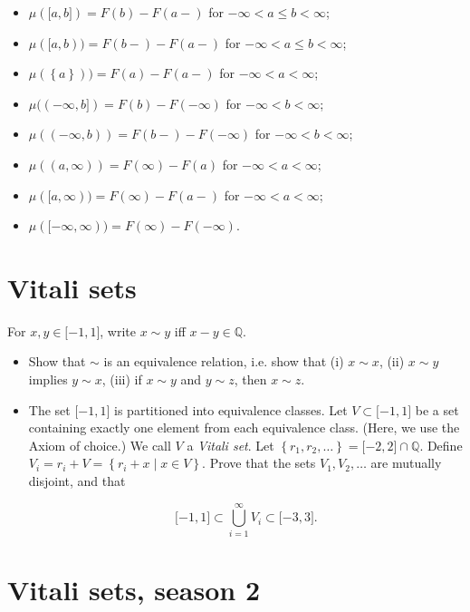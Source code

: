 \begin{itemize}
\item
  \(\mu(\lbrack a,b\rbrack) = F(b) - F(a - )\) for \(- \infty < a \leq b < \infty\);
\item
  \(\mu(\lbrack a,b)) = F(b - ) - F(a - )\) for \(- \infty < a \leq b < \infty\);
\item
  \(\mu(\left\{ a \right\})) = F(a) - F(a - )\) for \(- \infty < a < \infty\);
\item
  \(\mu(( - \infty,b\rbrack) = F(b) - F( - \infty)\) for \(- \infty < b < \infty\);
\item
  \(\mu(( - \infty,b)) = F(b - ) - F( - \infty)\) for \(- \infty < b < \infty\);
\item
  \(\mu((a,\infty)) = F(\infty) - F(a)\) for \(- \infty < a < \infty\);
\item
  \(\mu(\lbrack a,\infty)) = F(\infty) - F(a - )\) for \(- \infty < a < \infty\);
\item
  \(\mu(\lbrack - \infty,\infty)) = F(\infty) - F( - \infty)\).
\end{itemize}

\section{Vitali sets}\label{vitali-sets}

For \(x,y \in \lbrack - 1,1\rbrack\), write \(x \sim y\) iff \(x - y \in \mathbb{Q}\).

\begin{itemize}
\item
  Show that \(\sim\) is an equivalence relation, i.e. show that (i) \(x \sim x\), (ii) \(x \sim y\) implies \(y \sim x\), (iii) if \(x \sim y\) and \(y \sim z\), then \(x \sim z\).
\item
  The set \(\lbrack - 1,1\rbrack\) is partitioned into equivalence classes. Let \(V \subset \lbrack - 1,1\rbrack\) be a set containing exactly one element from each equivalence class. (Here, we use the Axiom of choice.) We call \(V\) a \emph{Vitali set}. Let \(\left\{ {r_{1},r_{2},\ldots} \right\} = \lbrack - 2,2\rbrack \cap \mathbb{Q}\). Define \(V_{i} = r_{i} + V = \left\{ {r_{i} + x \mid x \in V} \right\}\). Prove that the sets \(V_{1},V_{2},\ldots\) are mutually disjoint, and that

  \[\lbrack - 1,1\rbrack \subset \bigcup\limits_{i = 1}^{\infty}V_{i} \subset \lbrack - 3,3\rbrack.\]
\end{itemize}

\section{Vitali sets, season 2}\label{vitali-sets-season-2}

